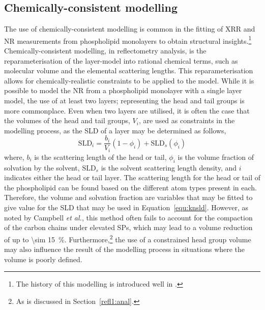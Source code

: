 \subsection{Chemically-consistent modelling}
The use of chemically-consistent modelling is common in the fitting of XRR and NR measurements from phospholipid monolayers to obtain structural insights.\footnote{The history of this modelling is introduced well in \cite{campbell_structure_2018}.}
Chemically-consistent modelling, in reflectometry analysis, is the reparameterisation of the layer-model into rational chemical terms, such as molecular volume and the elemental scattering lengths. 
This reparameterisation allows for chemically-realistic constraints to be applied to the model.  
While it is possible to model the NR from a phospholipid monolayer with a single layer model,\autocite{wojciechowski_interaction_2016,wojciechowski_complexation_2016} the use of at least two layers; representing the head and tail groups is more commonplace.\autocite{foglia_interaction_2014,bello_influence_2016}
Even when two layers are utilised, it is often the case that the volumes of the head and tail groups, $V_i$, are used as constraints in the modelling process, as the SLD of a layer may be determined as follows,
%
\begin{equation}
\text{SLD}_i = \frac{b_i}{V_i}(1-\phi_i)+\text{SLD}_s(\phi_i)
\label{equ:sld}
\end{equation}
%
where, $b_i$ is the scattering length of the head or tail, $\phi_i$ is the volume fraction of solvation by the solvent, $\text{SLD}_s$ is the solvent scattering length density, and $i$ indicates either the head or tail layer.
The scattering length for the head or tail of the phospholipid can be found based on the different atom types present in each. 
Therefore, the volume and solvation fraction are variables that may be fitted to give value for the SLD that may be used in Equation~\ref{equ:knsld}.
However, as noted by Campbell \emph{et al.},\autocite{campbell_structure_2018} this method often fails to account for the compaction of the carbon chains under elevated SPs,\autocite{mcconlogue_close_1997,small_lateral_1984} which may lead to a volume reduction of up to \SI{\sim 15}{\percent}.
Furthermore,\footnote{As is discussed in Section~\ref{refl1:anal}.} the use of a constrained head group volume may also influence the result of the modelling process in situations where the volume is poorly defined.

